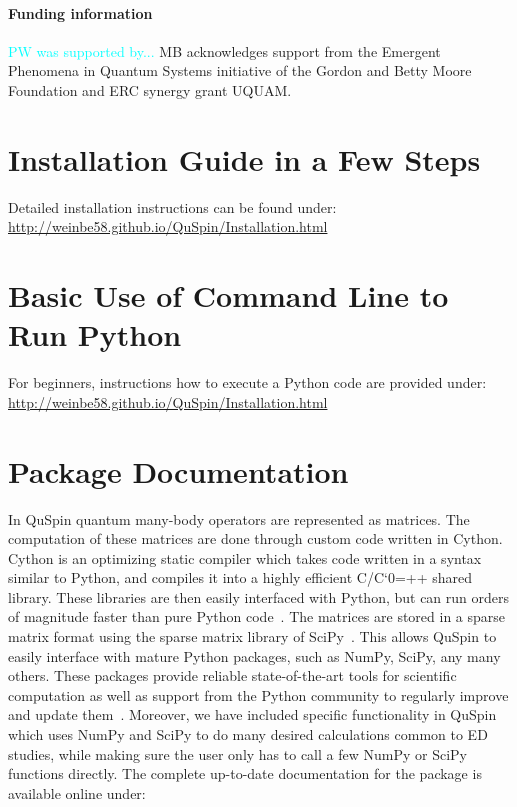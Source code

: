 \documentclass{SciPost}
\newcommand\0{\scalebox{-1}[1]{0}}
\let\svttfamily\ttfamily
\renewcommand\ttfamily{\svttfamily\catcode`0=\active }
\renewcommand\texttt{\bgroup\ttfamily\texttthelp}
\def\texttthelp#1{#1\egroup}
\newcommand*{\cyan}{\textcolor{cyan}}
\begin{document}
\paragraph{Funding information}
\cyan{PW was supported by...}
MB acknowledges support from the Emergent Phenomena in Quantum Systems initiative of the Gordon and Betty Moore Foundation and ERC synergy grant UQUAM.
\begin{appendix}
	
\section{Installation Guide in a Few Steps}
\label{app:install}
	
Detailed installation instructions can be found under:\\
	
\href{http://weinbe58.github.io/QuSpin/Installation.html}{http://weinbe58.github.io/QuSpin/Installation.html}\\
	
	
	
\section{Basic Use of Command Line to Run Python}
\label{app:cmd_line}

For beginners, instructions how to execute a Python code are provided under:\\

\href{http://weinbe58.github.io/QuSpin/Installation.html}{http://weinbe58.github.io/QuSpin/Installation.html}\\
	
\section{Package Documentation}
\label{app:doc}
In QuSpin quantum many-body operators are represented as matrices. The computation of these matrices are done through custom code written in Cython. Cython is an optimizing static compiler which takes code written in a syntax similar to Python, and compiles it into a highly efficient C/C\texttt{++} shared library. These libraries are then easily interfaced with Python, but can run orders of magnitude faster than pure Python code~\cite{Cython}. The matrices are stored in a sparse matrix format using the sparse matrix library of SciPy~\cite{SciPy_package}. This allows QuSpin to easily interface with mature Python packages, such as NumPy, SciPy, any many others. These packages provide reliable state-of-the-art tools for scientific computation as well as support from the Python community to regularly improve and update them~\cite{NumPy,Python_computing_1,Python_computing_2,SciPy_package}. Moreover, we have included specific functionality in QuSpin which uses NumPy and SciPy to do many desired calculations common to ED studies, while making sure the user only has to call a few NumPy or SciPy functions directly. The complete up-to-date documentation for the package is available online under:\\
	

\end{appendix}
\end{document}
